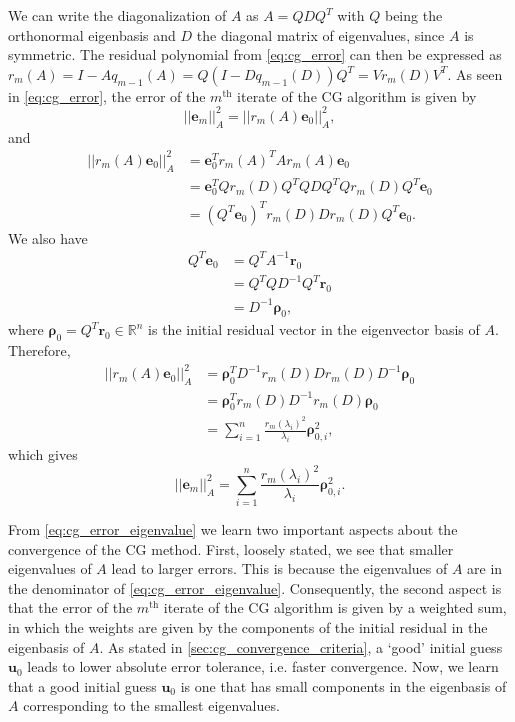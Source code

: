 We can write the diagonalization of $A$ as $A = QDQ^T$ with $Q$ being the orthonormal eigenbasis and $D$ the diagonal matrix of eigenvalues, since $A$ is symmetric. The residual polynomial from \cref{eq:cg_error} can then be expressed as $r_m(A) = I - Aq_{m-1}(A) = Q(I - Dq_{m-1}(D))Q^T = Vr_m(D)V^T$. As seen in \cref{eq:cg_error}, the error of the $m^{\text{th}}$ iterate of the CG algorithm is given by
\begin{equation*}
  ||\mathbf{e}_m||_A^2 = ||r_m(A)\mathbf{e}_0||_A^2,
\end{equation*}
and
\begin{align*}
  ||r_m(A)\mathbf{e}_0||_A^2 & = \mathbf{e}_0^T r_m(A)^T A r_m(A) \mathbf{e}_0                 \\
                             & = \mathbf{e}_0^T Q r_m(D) Q^T Q D Q^T Q r_m(D) Q^T \mathbf{e}_0 \\
                             & = (Q^T\mathbf{e}_0)^T r_m(D) D r_m(D) Q^T \mathbf{e}_0.
\end{align*}
We also have
\begin{align*}
  Q^T\mathbf{e}_0 & = Q^T A^{-1} \mathbf{r}_0       \\
                  & = Q^T Q D^{-1} Q^T \mathbf{r}_0 \\
                  & = D^{-1} \mathbf{\rho}_0,
\end{align*}
where $\mathbf{\rho}_0 = Q^T \mathbf{r}_0 \in \mathbb{R}^n$ is the initial residual vector in the eigenvector basis of $A$. Therefore,
\begin{align*}
  ||r_m(A)\mathbf{e}_0||_A^2 & = \mathbf{\rho}_0^T D^{-1} r_m(D) D r_m(D) D^{-1} \mathbf{\rho}_0        \\
                             & = \mathbf{\rho}_0^T r_m(D) D^{-1} r_m(D)  \mathbf{\rho}_0                \\
                             & = \sum_{i=1}^n \frac{r_m(\lambda_i)^2}{\lambda_i} \mathbf{\rho}_{0,i}^2,
\end{align*}
which gives
\begin{equation}
  ||\mathbf{e}_m||_A^2 = \sum_{i=1}^n \frac{r_m(\lambda_i)^2}{\lambda_i} \mathbf{\rho}_{0,i}^2.
  \label{eq:cg_error_eigenvalue}
\end{equation}

From \cref{eq:cg_error_eigenvalue} we learn two important aspects about the convergence of the CG method. First, loosely stated, we see that smaller eigenvalues of $A$ lead to larger errors. This is because the eigenvalues of $A$ are in the denominator of \cref{eq:cg_error_eigenvalue}. Consequently, the second aspect is that the error of the $m^{\text{th}}$ iterate of the CG algorithm is given by a weighted sum, in which the weights are given by the components of the initial residual in the eigenbasis of $A$. As stated in \cref{sec:cg_convergence_criteria}, a `good' initial guess $\mathbf{u}_0$ leads to lower absolute error tolerance, i.e. faster convergence. Now, we learn that a good initial guess $\mathbf{u}_0$ is one that has small components in the eigenbasis of $A$ corresponding to the smallest eigenvalues.

